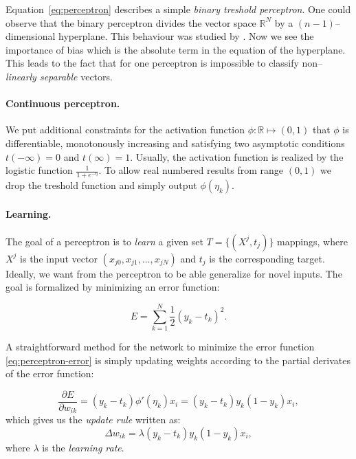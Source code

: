Equation~\ref{eq:perceptron} describes a simple \emph{binary treshold perceptron}. One could observe that the binary perceptron divides the vector space $\mathbb{R}^N$ by a $(n-1)$--dimensional hyperplane. This behaviour was studied by \citet{rosenblatt1958perceptron}. Now we see the importance of bias which is the absolute term in the equation of the hyperplane. \label{sec:linear-sep} This leads to the fact that for one perceptron is impossible to classify non--\emph{linearly separable} vectors. 

\paragraph{Continuous perceptron.}
We put additional constraints for the activation function $\phi : \mathbb{R} \mapsto (0,1)$ that $\phi$ is differentiable, monotonously increasing and satisfying two asymptotic conditions $t(-\infty)=0$ and $t(\infty)=1$.  Usually, the activation function is realized by the logistic function $\frac{1}{1 + e^{-\eta}}$. To allow real numbered results from range $(0,1)$ we drop the treshold function and simply output $\phi(\eta_k)$. 

\paragraph{Learning.} 
The goal of a perceptron is to \emph{learn} a given set $T = \{(X^j, t_j)\}$ mappings, where $X^j$ is the input vector $(x_{j0},x_{j1}, \ldots, x_{jN})$ and $t_j$ is the corresponding target. Ideally, we want from the perceptron to be able generalize for novel inputs. The goal is formalized by minimizing an error function: 

\begin{equation}
\label{eq:perceptron-error} 
E = \sum_{k=1}^{N} \frac{1}{2}(y_k-t_k)^2.
\end{equation} 

A straightforward method for the network to minimize the error function \ref{eq:perceptron-error} is simply updating weights according to the partial derivates of the error function: 

\begin{equation}
\label{eq:perceptron-learning} 
\frac{\partial E}{\partial w_{ik}} = (y_k - t_k)\phi'(\eta_k)x_i = (y_k - t_k)y_k(1 - y_k)x_i,
\end{equation} 
which gives us the \emph{update rule} written as: 
\
\begin{equation} 
\label{eq:perceptron-learning-rule} 
\Delta w_{ik} = \lambda (y_k - t_k)y_k(1 - y_k)x_i,
\end{equation} 
where $\lambda$ is the \emph{learning rate}. 

